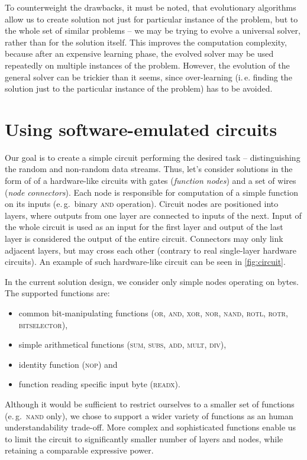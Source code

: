 \documentclass[12pt,oneside]{fithesis2}
\newcommand{\squarebullet}{\textcolor{black}{\raisebox{0.15em}{\rule{4pt}{4pt}}}}
\newenvironment{myItemize}{
  \begin{itemize}[leftmargin=2em,rightmargin=1em,itemsep=\parskip ,parsep=0em,topsep=0em,partopsep=0em]
  \renewcommand{\labelitemi}{\squarebullet}
  \renewcommand{\labelitemii}{$\diamond$}
}{
  \end{itemize}
}
\begin{document}
\noindent
To counterweight the drawbacks, it must be noted, that evolutionary algorithms allow us to create solution not just for particular
instance of the problem, but to the whole set of similar problems -- we may be trying to evolve a universal solver, 
rather than for the solution itself. 
This improves the computation complexity, because after an expensive learning phase, the evolved solver may be used
repeatedly on multiple instances of the problem. However, the evolution of the general solver can be trickier than it seems,
since over-learning (i.\,e. finding the solution just to the particular instance of the problem) has to be avoided.

\section{Using software-emulated circuits}
\label{sec:sw-circuits}

Our goal is to create a simple circuit performing the desired task -- distinguishing the random and non-random data streams.
Thus, let's consider solutions in the form of of a hardware-like circuits with gates (\textit{function nodes}) 
and a set of wires (\textit{node connectors}).
Each node is responsible for computation of a simple function on its inputs (e.\,g.\ binary \textsc{and} operation).
Circuit nodes are positioned into layers, where outputs from one layer are connected to inputs of the next. Input of the whole
circuit is used as an input for the first layer and output of the last layer is considered the output of the entire circuit.
Connectors may only link adjacent layers, but may cross each other (contrary to real single-layer hardware circuits).
An example of such hardware-like circuit can be seen in \autoref{fig:circuit}.

In the current solution design, we consider only simple nodes operating on bytes. The supported functions are:
\begin{myItemize}
\item common bit-manipulating functions (\textsc{or, and, xor, nor, nand, rotl, rotr, bitselector}),
\item simple arithmetical functions (\textsc{sum, subs, add, mult, div}),
\item identity function (\textsc{nop}) and
\item function reading specific input byte (\textsc{readx}).
\end{myItemize}

\noindent
Although it would be sufficient to restrict ourselves to a smaller set of functions (e.\,g.\ \textsc{nand} only),
we chose to support a wider variety of functions as an human understandability trade-off.
More complex and sophisticated functions enable us to limit the circuit to significantly smaller number of layers and nodes,
while retaining a comparable expressive power.
\end{document}
